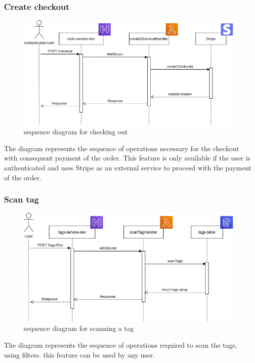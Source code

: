 \subsubsection{Create checkout}
\begin{figure}[!h]
    \vspace{5px}
    \includegraphics[scale=0.5]{../../../../Images/Diagrammi/maintainerManual/createCheckoutSequence.png}
    \centering
    \caption{sequence diagram for checking out} 
\end{figure}
The diagram represents the sequence of operations necessary for the checkout with consequent payment of the order. This feature is only available if the user is authenticated and uses Stripe as an external service to proceed with the payment of the order.
\pagebreak
\subsubsection{Scan tag}
\begin{figure}[!h]
    \vspace{5px}
    \includegraphics[scale=0.5]{../../../../Images/Diagrammi/maintainerManual/scanTagSequence.png}
    \centering
    \caption{sequence diagram for scanning a tag} 
\end{figure}
The diagram represents the sequence of operations required to scan the tags, using filters. this feature can be used by any user.
\pagebreak
